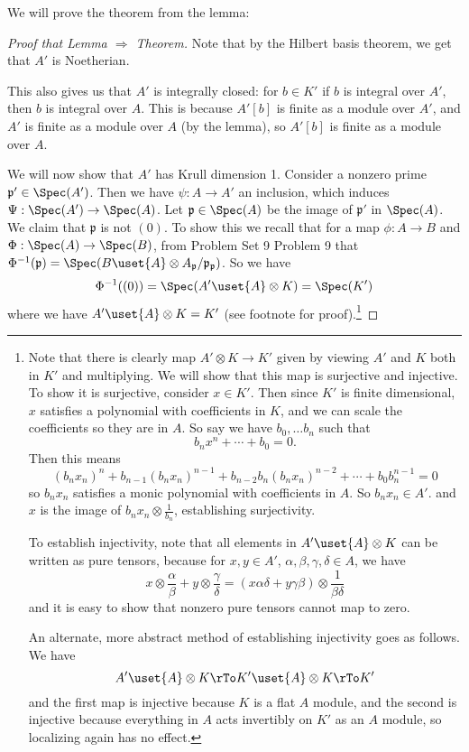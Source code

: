 \documentclass[12 pt]{article}
\theoremstyle{definition}
\renewcommand{\(}{\left(}
\renewcommand{\)}{\right)}
\newcommand\fp{{\mathfrak p}}
\begin{document}
We will prove the theorem from the lemma:
\begin{proof}[Proof that Lemma $\Rightarrow$ Theorem]
Note that by the Hilbert basis theorem, we get that $A'$ is Noetherian.

This also gives us that $A'$ is integrally closed: for $b \in K'$ if $b$ is integral over $A'$, then $b$ is integral over $A$. This is because $A'[b]$ is finite as a module over $A'$, and $A'$ is finite as a module over $A$ (by the lemma), so $A'[b]$ is finite as a module over $A$.

We will now show that $A'$ has Krull dimension 1. Consider a nonzero prime $\fp' \in \Spec(A')$. Then we have $\psi:A \to A'$ an inclusion, which induces $\Psi:\Spec(A') \to \Spec(A)$. Let $\fp \in \Spec(A)$ be the image of $\fp'$ in $\Spec(A)$. We claim that $\fp$ is not $(0)$. To show this we recall that for a map $\phi:A \to B$ and $\Phi:\Spec(A) \to \Spec(B)$, from Problem Set 9 Problem 9 that $\Phi^{-1}(\fp)=\Spec(B \uset{A}\otimes A_{\fp}/\fp_\fp)$. So we have
\[\Phi^{-1}((0))=\Spec(A' \uset{A}\otimes K)=\Spec(K')\]
where we have $A' \uset{A}\otimes K = K'$ (see footnote for proof).\footnote{Note that there is clearly map $A' \otimes K \to K'$ given by viewing $A'$ and $K$ both in $K'$ and multiplying. We will show that this map is surjective and injective. To show it is surjective, consider $x \in K'$. Then since $K'$ is finite dimensional, $x$ satisfies a polynomial with coefficients in $K$, and we can scale the coefficients so they are in $A$. So say we have $b_0, \ldots b_n$ such that
\[b_nx^n +\cdots +b_0=0.\]
Then this means
\[(b_nx_n)^n+b_{n-1}(b_nx_n)^{n-1}+b_{n-2}b_n(b_nx_n)^{n-2}+\cdots+b_0b_n^{n-1}=0\]
so $b_nx_n$ satisfies a monic polynomial with coefficients in $A$. So $b_nx_n \in A'$. and $x$ is the image of $b_nx_n \otimes \frac{1}{b_n}$, establishing surjectivity.

To establish injectivity, note that all elements in $A' \uset{A}\otimes K$ can be written as pure tensors, because for $x,y \in A'$, $\alpha, \beta, \gamma, \delta \in A$, we have
\[x \otimes \frac{\alpha}{\beta}+y \otimes \frac{\gamma}{\delta}=(x\alpha \delta+y \gamma \beta)\otimes \frac{1}{\beta \delta}\]
and it is easy to show that nonzero pure tensors cannot map to zero.

An alternate, more abstract method of establishing injectivity goes as follows. We have
\[A' \uset{A}\otimes K \rTo K' \uset{A}\otimes K \rTo K'\]
and the first map is injective because $K$ is a flat $A$ module, and the second is injective because everything in $A$ acts invertibly on $K'$ as an $A$ module, so localizing again has no effect.}


\end{proof}
\end{document}
